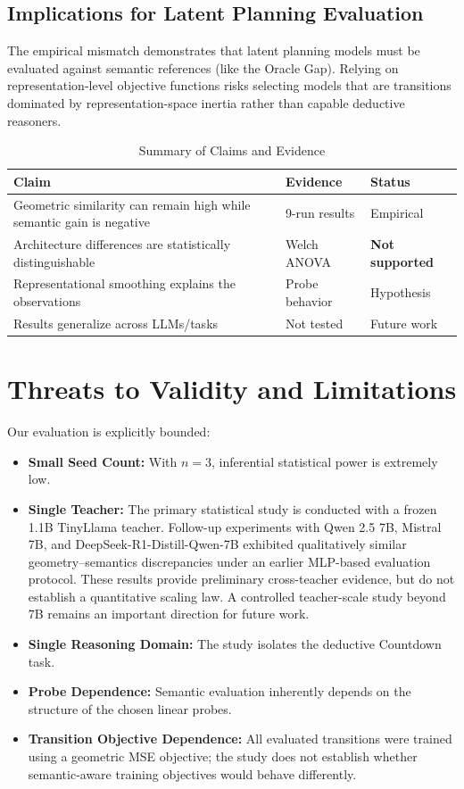 \documentclass[conference]{IEEEtran}
\begin{document}
\subsection{Implications for Latent Planning Evaluation}
The empirical mismatch demonstrates that latent planning models must be evaluated against semantic references (like the Oracle Gap). Relying on representation-level objective functions risks selecting models that are transitions dominated by representation-space inertia rather than capable deductive reasoners.

\begin{table}[t]
\centering
\caption{Summary of Claims and Evidence}
\label{tab:claims}
\small
\setlength{\tabcolsep}{3pt}
\begin{tabular}{@{}p{3.6cm}p{1.6cm}l@{}}
\toprule
\textbf{Claim} & \textbf{Evidence} & \textbf{Status} \\
\midrule
Geometric similarity can remain high while semantic gain is negative & 9-run results & Empirical \\
\midrule
Architecture differences are statistically distinguishable & Welch ANOVA & \textbf{Not supported} \\
\midrule
Representational smoothing explains the observations & Probe behavior & Hypothesis \\
\midrule
Results generalize across LLMs/tasks & Not tested & Future work \\
\bottomrule
\end{tabular}
\end{table}

\section{Threats to Validity and Limitations}
Our evaluation is explicitly bounded:
\begin{itemize}
    \item \textbf{Small Seed Count:} With $n=3$, inferential statistical power is extremely low.
    \item \textbf{Single Teacher:} The primary statistical study is conducted with a frozen 1.1B TinyLlama teacher. Follow-up experiments with Qwen 2.5 7B, Mistral 7B, and DeepSeek-R1-Distill-Qwen-7B exhibited qualitatively similar geometry--semantics discrepancies under an earlier MLP-based evaluation protocol. These results provide preliminary cross-teacher evidence, but do not establish a quantitative scaling law. A controlled teacher-scale study beyond 7B remains an important direction for future work.
    \item \textbf{Single Reasoning Domain:} The study isolates the deductive Countdown task.
    \item \textbf{Probe Dependence:} Semantic evaluation inherently depends on the structure of the chosen linear probes.
    \item \textbf{Transition Objective Dependence:} All evaluated transitions were trained using a geometric MSE objective; the study does not establish whether semantic-aware training objectives would behave differently.
\end{itemize}
\end{document}
